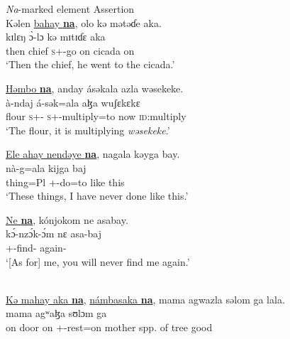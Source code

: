 \textit{Na}-marked element  \hspace{40pt}    Assertion
\ea \label{ex:11:27}
\\
Kəlen  \underline{bahay  \textbf{na}}, \hspace{30pt}  olo  kə  mətəɗe  aka.\\
\gll  kɪlɛŋ     \hspace{35pt}   \`{ɔ}-lɔ          kə  mɪtɪɗɛ  aka\\
      then    chief {\PSP} {}   \textsc{s}+{\PFV}-go        on  cicada  on\\
\glt  ‘Then the chief, he went to the cicada.’  
\z

\ea \label{ex:11:28}
\underline{Həmbo  \textbf{na}},  anday  ásəkala  azla  wəsekeke.\\
\gll  {}      à-ndaj     á-sək=ala      aɮa   wuʃɛkɛkɛ\\
      flour  {\PSP}  \textsc{s}+{\PFV}-{\PRG}   \textsc{s}+{\IFV}-multiply=to  now    \textsc{id}:multiply\\
\glt  ‘The flour, it is multiplying \textit{wəsekeke}.’
\z

\ea \label{ex:11:29}
\underline{Ele  ahay  nendəye  \textbf{na}},  nagala  kəyga  bay.\\
\gll  {}      nà-g=ala  kijga  baj\\
      thing=Pl        {\DEM}     {\PSP}  {\oneS}+{\PFV}-do=to     {like this}  {\NEG}\\
\glt ‘These things, I have never done like this.’
\z

\ea \label{ex:11:30}
\underline{Ne  \textbf{na}},  kónjokom  ne  asabay. \\
\gll  {}     k\'ɔ-nz\'ɔk-\'ɔm  nɛ  asa-baj \\
      {\oneS}    {\PSP}    {\twoP}+{\IFV}-find-{\twoP}  {\oneS}  again-{\NEG}\\
\glt  ‘[As for] me, you will never find me again.’
\z

\ea \label{ex:11:31}
\\
\underline{Kə  mahay  aka  \textbf{na}}, \underline{námbasaka  \textbf{na}},  mama  agwazla  səlom  ga  lala.\\
\gll  {}            mama   agʷaɮa    sʊlɔm  ga \\    
      on  door  on  {\PSP}  {\oneS}+{\IFV}-rest=on    {\PSP}  mother  {spp. of tree}  good   {\ADJ} \\  
      

